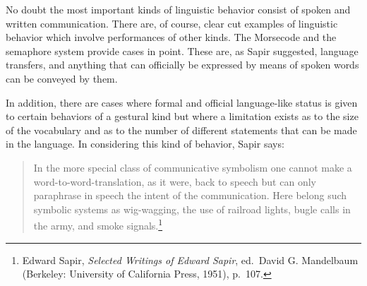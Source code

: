 \documentclass[twoside,symmetric,nobib,justified]{tufte-book}
\begin{document}
No doubt the most important kinds of linguistic behavior consist of
spoken and written communication. There are, of course, clear cut
examples of linguistic behavior which involve performances of other
kinds. The Morse\newpage\noindent code and the semaphore system provide cases in point.
These are, as Sapir suggested, language transfers, and anything that can
officially be expressed by means of spoken words can be conveyed by
them.

In addition, there are cases where formal and official language-like
status is given to certain behaviors of a gestural kind but where a
limitation exists as to the size of the vocabulary and as to the number
of different statements that can be made in the language. In considering
this kind of behavior, Sapir says:

\begin{quote}
In the more special class of communicative symbolism one cannot make a
word-to-word-translation, as it were, back to speech but can only
paraphrase in speech the intent of the communication. Here belong such
symbolic systems as wig-wagging, the use of railroad lights, bugle calls
in the army, and smoke signals.\footnote{Edward Sapir, \emph{Selected
  Writings of Edward Sapir}, ed.~David G. Mandelbaum (Berkeley:
  University of California Press, 1951), p.~107.}
\end{quote}
\end{document}
